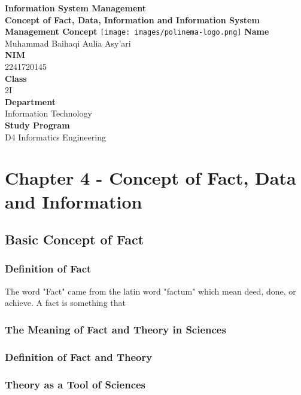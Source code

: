 \documentclass[12pt,titlepage]{article}
\newcommand{\vSubject}{Information System Management}
\newcommand{\vSubtitle}{Concept of Fact, Data, Information and Information System Management Concept}
\newcommand{\vName}{Muhammad Baihaqi Aulia Asy'ari}
\newcommand{\vNIM}{2241720145}
\newcommand{\vClass}{2I}
\newcommand{\vDepartment}{Information Technology}
\newcommand{\vStudyProgram}{D4 Informatics Engineering}
\begin{document}
\begin{titlepage}
    \centering
    \vfill
    {\bfseries\LARGE
        \vSubject\\
        \vskip0.25cm
        \vSubtitle
    }
    \vfill
    \texttt{[image: images/polinema-logo.png]}
    \vfill
    {
        \textbf{Name}\\
        \vName\\
        \vskip0.5cm
        \textbf{NIM}\\
        \vNIM\\
        \vskip0.5cm
        \textbf{Class}\\
        \vClass\\
        \vskip0.5cm
        \textbf{Department}\\
        \vDepartment\\
        \vskip0.5cm
        \textbf{Study Program}\\
        \vStudyProgram
    }
\end{titlepage}

\newpage

\tableofcontents

\newpage

\section{Chapter 4 - Concept of Fact, Data and Information}

\subsection{Basic Concept of Fact}
\subsubsection{Definition of Fact}
The word "Fact" came from the latin word "factum" which mean deed, done, or achieve. A fact is something that 
\subsubsection{The Meaning of Fact and Theory in Sciences}
\subsubsection{Definition of Fact and Theory}
\subsubsection{Theory as a Tool of Sciences}
\end{document}
